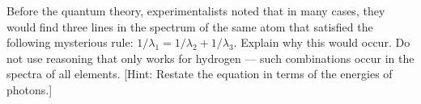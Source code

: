 Before the quantum theory, experimentalists noted that in
many cases, they would find three lines in the spectrum of
the same atom that satisfied the following mysterious rule:
$1/\lambda_1=1/\lambda_2+1/\lambda_3$. Explain why this
would occur.  Do not use reasoning that only works for
hydrogen --- such combinations occur in the spectra of all
elements. [Hint: Restate the equation in terms of the
energies of photons.]

